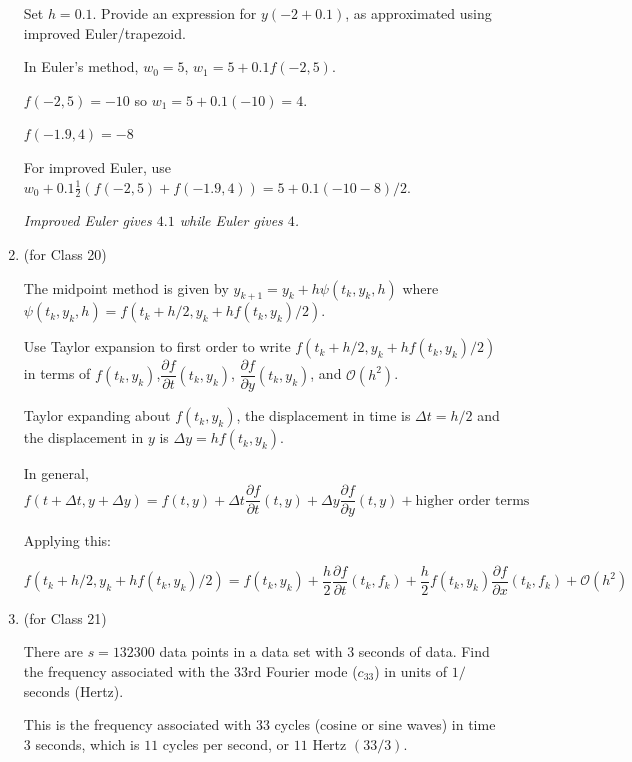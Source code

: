 \documentclass[12pt,letterpaper,answers]{exam}
\begin{document}
\begin{enumerate}
Set $h = 0.1$.  Provide an expression for $y(-2+0.1)$, as approximated using improved Euler/trapezoid.

\begin{solution}
In Euler's method, $w_0 = 5$, $w_1 = 5 + 0.1f(-2,5)$.

$f(-2,5) = -10$ so $w_1 = 5+0.1(-10) = 4$.  

$f(-1.9,4) = -8$

For improved Euler, use $w_0 + 0.1 \frac{1}{2}(f(-2,5) +f(-1.9,4)) = 5+0.1(-10-8)/2$.

\emph{Improved Euler gives $4.1$ while Euler gives $4$.}
\end{solution}


\item (for Class 20)

The midpoint method is given by $y_{k+1} = y_k + h\psi(t_k,y_k,h)$ where $\psi(t_k,y_k,h) = f(t_k+h/2,y_k+hf(t_k,y_k)/2)$.

Use Taylor expansion to first order to write $f(t_k+h/2,y_k+hf(t_k,y_k)/2)$ in terms of $f(t_k, y_k)$,$\dfrac{\partial f}{\partial t}(t_k,y_k)$, $\dfrac{\partial f}{\partial y}(t_k,y_k)$, and $\mathcal{O}(h^2)$.

\begin{solution}
Taylor expanding about $f(t_k, y_k)$, the displacement in time is $\Delta t = h/2$ and the displacement in $y$ is $\Delta y = hf(t_k,y_k)$.

In general, $f(t+\Delta t, y+\Delta y) = f(t,y) + \Delta t \dfrac{\partial f}{\partial t}(t,y) +  \Delta y \dfrac{\partial f}{\partial y}(t,y) + \text{higher order terms}$


Applying this:

$f(t_k+h/2,y_k+hf(t_k,y_k)/2) = f(t_k,y_k) + \dfrac{h}{2} \dfrac{\partial f}{\partial t}(t_k,f_k) + \dfrac{h}{2}f(t_k,y_k) \dfrac{\partial f}{\partial x}(t_k,f_k) + \mathcal{O}(h^2)$

\end{solution}


\item (for Class 21)

There are $s = 132300$ data points in a data set with $3$ seconds of data.  Find the frequency associated with the $33$rd Fourier mode ($c_{33}$) in units of $1/$seconds (Hertz).

\begin{solution}
This is the frequency associated with $33$ cycles (cosine or sine waves) in time $3$ seconds, which is $11$ cycles per second, or $11$ Hertz $(33/3)$.
\end{solution}



\end{enumerate}
\end{document}
